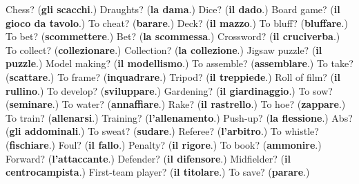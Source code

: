 \begin{tcolorbox}[breakable,colback=teal!4,colframe=teal!35!black,title={Before you move on}]
Chess? (\textbf{gli scacchi}.) Draughts? (\textbf{la dama}.) Dice? (\textbf{il dado}.) Board game? (\textbf{il gioco da tavolo}.) To cheat? (\textbf{barare}.) Deck? (\textbf{il mazzo}.) To bluff? (\textbf{bluffare}.) To bet? (\textbf{scommettere}.) Bet? (\textbf{la scommessa}.) Crossword? (\textbf{il cruciverba}.) To collect? (\textbf{collezionare}.) Collection? (\textbf{la collezione}.) Jigsaw puzzle? (\textbf{il puzzle}.) Model making? (\textbf{il modellismo}.) To assemble? (\textbf{assemblare}.) To take? (\textbf{scattare}.) To frame? (\textbf{inquadrare}.) Tripod? (\textbf{il treppiede}.) Roll of film? (\textbf{il rullino}.) To develop? (\textbf{sviluppare}.) Gardening? (\textbf{il giardinaggio}.) To sow? (\textbf{seminare}.) To water? (\textbf{annaffiare}.) Rake? (\textbf{il rastrello}.) To hoe? (\textbf{zappare}.) To train? (\textbf{allenarsi}.) Training? (\textbf{l'allenamento}.) Push-up? (\textbf{la flessione}.) Abs? (\textbf{gli addominali}.) To sweat? (\textbf{sudare}.) Referee? (\textbf{l'arbitro}.) To whistle? (\textbf{fischiare}.) Foul? (\textbf{il fallo}.) Penalty? (\textbf{il rigore}.) To book? (\textbf{ammonire}.) Forward? (\textbf{l'attaccante}.) Defender? (\textbf{il difensore}.) Midfielder? (\textbf{il centrocampista}.) First-team player? (\textbf{il titolare}.) To save? (\textbf{parare}.)
\end{tcolorbox}
